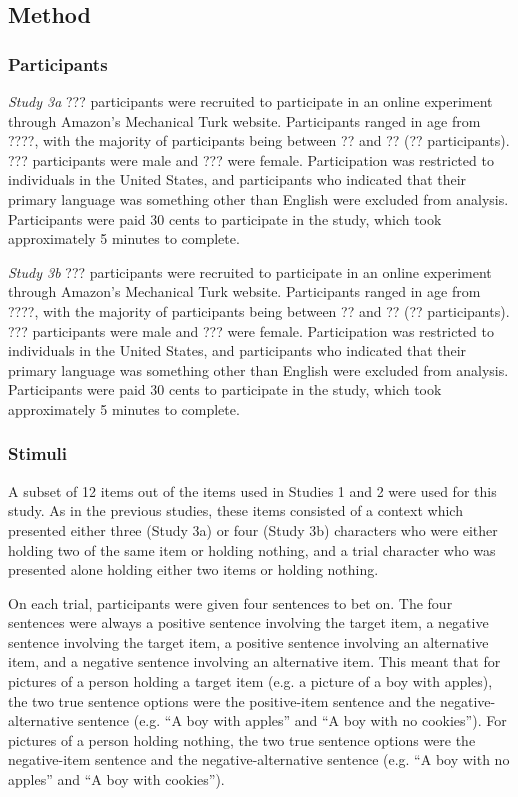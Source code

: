 \documentclass[10pt,letterpaper]{article}
\begin{document}
\subsection{Method}

\subsubsection{Participants}
\emph{Study 3a}
??? participants were recruited to participate in an online experiment through Amazon's Mechanical Turk website.  Participants ranged in age from ????, with the majority of participants being between ?? and ?? (?? participants).  ??? participants were male and ??? were female.  Participation was restricted to individuals in the United States, and participants who indicated that their primary language was something other than English were excluded from analysis.  Participants were paid 30 cents to participate in the study, which took approximately 5 minutes to complete.  

\emph{Study 3b}
??? participants were recruited to participate in an online experiment through Amazon's Mechanical Turk website.  Participants ranged in age from ????, with the majority of participants being between ?? and ?? (?? participants).  ??? participants were male and ??? were female.  Participation was restricted to individuals in the United States, and participants who indicated that their primary language was something other than English were excluded from analysis.  Participants were paid 30 cents to participate in the study, which took approximately 5 minutes to complete.  

\subsubsection{Stimuli}
A subset of 12 items out of the items used in Studies 1 and 2 were used for this study.  As in the previous studies, these items consisted of a context which presented either three (Study 3a) or four (Study 3b) characters who were either holding two of the same item or holding nothing, and a trial character who was presented alone holding either two items or holding nothing.  

On each trial, participants were given four sentences to bet on.  The four sentences were always a positive sentence involving the target item, a negative sentence involving the target item, a positive sentence involving an alternative item, and a negative sentence involving an alternative item.  This meant that for pictures of a person holding a target item (e.g. a picture of a boy with apples), the two true sentence options were the positive-item sentence and the negative-alternative sentence (e.g. ``A boy with apples'' and ``A boy with no cookies'').  For pictures of a person holding nothing, the two true sentence options were the negative-item sentence and the negative-alternative sentence (e.g. ``A boy with no apples'' and ``A boy with cookies'').   
\end{document}
